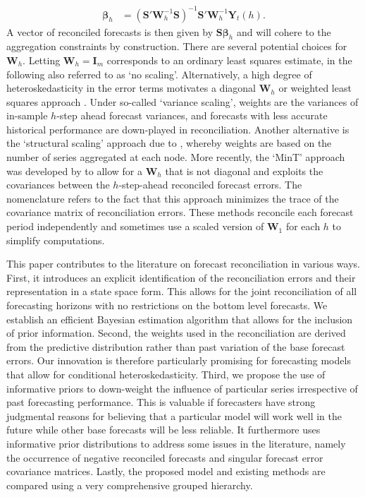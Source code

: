\documentclass[a4paper,fleqn,11pt]{article}
\begin{document}
\begin{align}
\label{eq:reg}
\boldsymbol{\beta}_{h} &= \left(\textbf{S}'\textbf{W}_h^{-1}\textbf{S} \right)^{-1} \textbf{S}'\textbf{W}_h^{-1}\textbf{Y}_t(h).
\end{align}
A vector of reconciled forecasts is then given by $\textbf{S} \boldsymbol{\beta}_{h}$ and will cohere to the aggregation constraints by construction. There are several potential choices for $\textbf{W}_h$. Letting $\textbf{W}_h = \textbf{I}_m$ corresponds to an ordinary least squares estimate, in the following also referred to as `no scaling'. Alternatively, a high degree of heteroskedasticity in the error terms motivates a diagonal $\textbf{W}_h$ or weighted least squares approach \citep{Hyndman2016}. Under so-called `variance scaling', weights are the variances of in-sample $h$-step ahead forecast variances, and forecasts with less accurate historical performance are down-played in reconciliation. Another alternative is the `structural scaling' approach due to \cite{Athanasopoulos2017}, whereby weights are based on the number of series aggregated at each node. More recently, the `MinT' approach was developed by \cite{Wickramasuriya2015} to allow for a $\textbf{W}_h$ that is not diagonal and exploits the covariances between the $h$-step-ahead reconciled forecast errors. The nomenclature refers to the fact that this approach minimizes the trace of the covariance matrix of reconciliation errors. These methods reconcile each forecast period independently and sometimes use a scaled version of $\textbf{W}_1$ for each $h$ to simplify computations.

This paper contributes to the literature on forecast reconciliation in various ways. First, it introduces an explicit identification of the reconciliation errors and their representation in a state space form. This allows for the joint reconciliation of all forecasting horizons with no restrictions on the bottom level forecasts. We establish an efficient Bayesian estimation algorithm that allows for the inclusion of prior information. Second, the weights used in the reconciliation are derived from the predictive distribution rather than past variation of the base forecast errors. Our innovation is therefore particularly promising for forecasting models that allow for conditional heteroskedasticity. Third, we propose the use of informative priors to down-weight the influence of particular series irrespective of past forecasting performance. This is valuable if forecasters have strong judgmental reasons for believing that a particular model will work well in the future while other base forecasts will be less reliable. It furthermore uses informative prior distributions to address some issues in the literature, namely the occurrence of negative reconciled forecasts and singular forecast error covariance matrices. Lastly, the proposed model and existing methods are compared using a very comprehensive grouped hierarchy.
\end{document}
